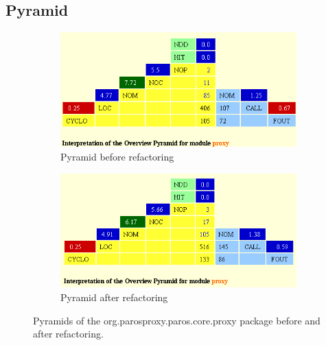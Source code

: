\subsection{Pyramid}
\begin{figure}[h]
	\begin{subfigure}{0.5\textwidth}
		\centering
		\includegraphics[width=0.9\linewidth]{../Diagrams/pyramidPreRefactoringNoInfo}
		\caption{Pyramid before refactoring}
		\label{fig:sfig1}
	\end{subfigure}%
	\begin{subfigure}{0.5\textwidth}
		\centering
		\includegraphics[width=0.9\linewidth]{../Diagrams/pyramidPostRefactoringNoInfo}
		\caption{Pyramid after refactoring}
		\label{fig:sfig2}
	\end{subfigure}
	\caption{Pyramids of the org.parosproxy.paros.core.proxy package before and after refactoring.}
	\label{fig:fig}
\end{figure}

